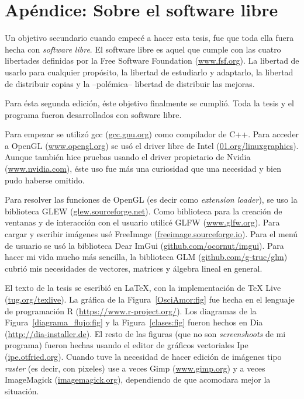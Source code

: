 \chapter*{Apéndice: Sobre el software libre}
\label{sec:apendice}

Un objetivo secundario cuando empecé a hacer esta tesis, fue que toda ella fuera hecha con \emph{software libre}.
El software libre es aquel que cumple con las cuatro libertades definidas por la Free Software Foundation (\href{https://www.fsf.org}{www.fsf.org}).
La libertad de usarlo para cualquier propósito, la libertad de estudiarlo y adaptarlo, la libertad de distribuir copias y la --polémica-- libertad de distribuir las mejoras.

Para ésta segunda edición, éste objetivo finalmente se cumplió. Toda la tesis y el programa fueron desarrollados con software libre.

Para empezar se utilizó gcc (\href{http://gcc.gnu.org/}{gcc.gnu.org}) como compilador de C++.
Para acceder a OpenGL (\href{https://www.opengl.org/}{www.opengl.org}) se usó el driver libre de Intel (\href{https://01.org/linuxgraphics}{01.org/linuxgraphics}).
Aunque también hice pruebas usando el driver propietario de Nvidia (\href{https://www.nvidia.com}{www.nvidia.com}), éste uso fue más una curiosidad que una necesidad y bien pudo haberse omitido.

Para resolver las funciones de OpenGL (es decir como \emph{\textenglish{extension loader}}), se uso la biblioteca GLEW (\href{http://glew.sourceforge.net/}{glew.sourceforge.net}).
Como biblioteca para la creación de ventanas y de interacción con el usuario utilicé GLFW (\href{https://www.glfw.org/}{www.glfw.org}).
Para cargar y escribir imágenes usé FreeImage (\href{https://freeimage.sourceforge.io/}{freeimage.sourceforge.io}).
Para el menú de usuario se usó la biblioteca Dear ImGui (\href{https://github.com/ocornut/imgui}{github.com/ocornut/imgui}).
Para hacer mi vida mucho más sencilla, la biblioteca GLM (\href{https://github.com/g-truc/glm}{github.com/g-truc/glm}) cubrió mis necesidades de vectores, matrices y álgebra lineal en general.

El texto de la tesis se escribió en \LaTeX, con la implementación de TeX Live (\href{https://tug.org/texlive/}{tug.org/texlive}).
La gráfica de la Figura~\ref{OsciAmor:fig} fue hecha en el lenguaje de programación R (\href{https://www.r-project.org/}{https://www.r-project.org/}).
Los diagramas de la Figura~\ref{diagrama_flujo:fig} y la Figura~\ref{clases:fig} fueron hechos en Dia (\href{http://dia-installer.de/index.html.en}{http://dia-installer.de}).
El resto de las figuras (que no son \emph{\textenglish{screenshoots}} de mi programa) fueron hechas usando el editor de gráficos vectoriales Ipe (\href{https://ipe.otfried.org/}{ipe.otfried.org}).
Cuando tuve la necesidad de hacer edición de imágenes tipo \emph{\textenglish{raster}} (es decir, con pixeles) use a veces Gimp (\href{https://www.gimp.org/}{www.gimp.org}) y a veces ImageMagick (\href{https://imagemagick.org/index.php}{imagemagick.org}), dependiendo de que acomodara mejor la situación.

